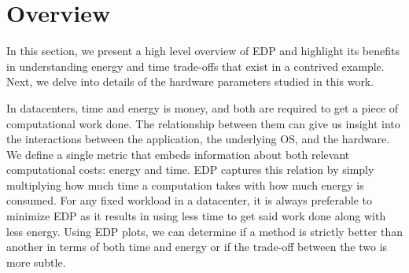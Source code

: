 \section{Overview}
In this section, we present a high level overview of EDP and highlight its
benefits in understanding energy and time trade-offs that exist in a contrived
example. Next, we delve into details of the hardware parameters studied in this
work.

%
In datacenters, time and energy is money, and both are required to get a piece
of computational work done. The relationship between them can give us insight
into the interactions between the application, the underlying OS, and the
hardware. We define a single metric that embeds information about both relevant
computational costs: energy and time. EDP captures this relation by simply
multiplying how much time a computation takes with how much energy is consumed.
For any fixed workload in a datacenter, it is always preferable to minimize EDP
as it results in using less time to get said work done along with less energy.
Using EDP plots, we can determine if a method is strictly better than another
in terms of both time and energy or if the trade-off between the two is more
subtle.

